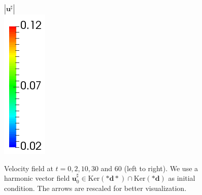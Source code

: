 \documentclass{xdms}
\newcommand{\ub}{\mathbf{u}} %
\newcommand{\exd}{\mathbf{d}} %
\begin{document}
\begin{figure}[h]
\begin{minipage}{0.92\textwidth}
	\end{minipage}
	\begin{minipage}{0.06\textwidth}
		\centering
		$|\ub^{\sharp}|$\\
		\includegraphics[width=\textwidth]{pic/torus/vColorbar.png}
	\end{minipage}
	\caption{Velocity field at $t = 0, 2, 10, 30$ and $60$ (left to right). We use a harmonic vector field \( \ub^{\sharp}_{0}\in\text{Ker}(*\exd*) \cap \text{Ker}(*\exd) \) as initial condition. 
  The arrows are rescaled for better visualization.}
	\label{fig:torus:2}
\end{figure}
\vspace{-6pt}%
\end{document}

